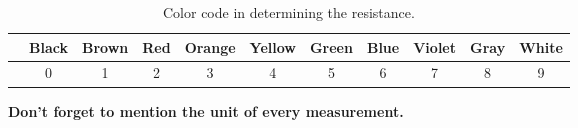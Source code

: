\begin{table}
    \caption{Color code in determining the resistance.}
    \centering
    \begin{tabular}{|l||c|c|c|c|c|c|c|c|c|c|}
    \toprule
      \cellcolor{yellow!30}{\bf Color} & Black & Brown & Red & Orange & Yellow & Green & Blue & Violet & Gray & White\\
      \hline
      \cellcolor{yellow!30}{\bf Digit} & 0 & 1 & 2 & 3 & 4 & 5 & 6 & 7 & 8 & 9\\
    \bottomrule         
    \end{tabular}
    \label{tab:resistanceColorCode}        
\end{table}


\begin{mdframed}[roundcorner=5pt,backgroundcolor=yellow!5]
  {\bf Don't forget to mention  the unit of every measurement.}
\end{mdframed}

 
